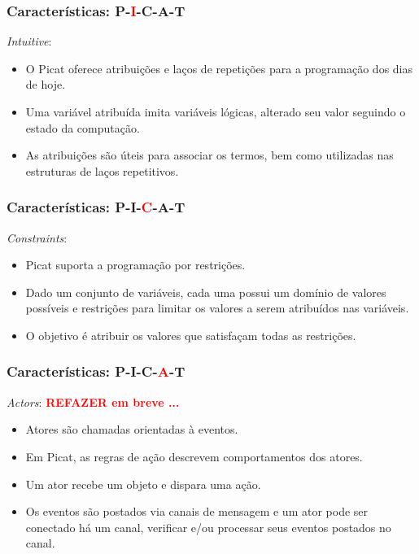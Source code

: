 \documentclass[10pt]{beamer}
\begin{document}
\begin{frame}
    \frametitle{Características: P-\textcolor{red}{I}-C-A-T}
    \textit{Intuitive}:\\ 
 \begin{itemize}
 
 \item     O Picat oferece atribuições e laços de repetições para a programação dos dias de hoje. 
 \item         Uma variável atribuída  imita  variáveis lógicas, alterado seu valor seguindo o estado da computação. 
 \item        As atribuições são úteis para associar os termos, bem como utilizadas nas estruturas de laços repetitivos. 
    
 \end{itemize}
    
    
\end{frame}


\begin{frame}
    \frametitle{Características: P-I-\textcolor{red}{C}-A-T}
    \textit{Constraints}:\\ 
\begin{itemize}
      \item   Picat suporta a programação por restrições. 
 
  \item  Dado um conjunto de variáveis, 
    cada uma possui um domínio de valores possíveis e restrições para limitar os valores a serem atribuídos nas variáveis. 
 
 \item    O objetivo é atribuir os valores que satisfaçam todas as restrições. 

    \end{itemize}
    \end{frame}


\begin{frame}
    \frametitle{Características: P-I-C-\textcolor{red}{A}-T}
    \textit{Actors}: \textcolor{red}{ \textbf{REFAZER em breve  ...}}
  \begin{itemize}
      \item   Atores são chamadas orientadas à eventos.
		\item Em Picat, as regras de ação descrevem comportamentos dos atores.
\item 		Um ator recebe um objeto e dispara uma ação. 
\item 		Os eventos são postados via canais de mensagem e um ator pode ser conectado há um canal, verificar e/ou processar seus eventos postados no canal.

    \end{itemize}   
\end{frame}
\end{document}
